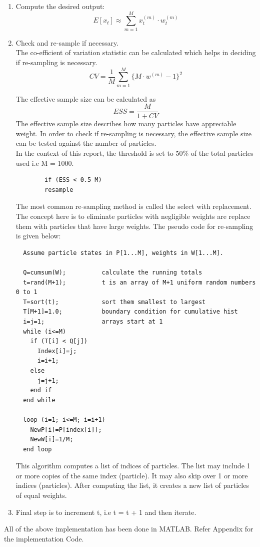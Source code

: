 \documentclass[12pt]{article}
\begin{document}
\begin{enumerate}
	\item Compute the desired output:
	\begin{equation}
		E[x_t] \approx \sum_{m=1}^M x_t^{(m)} \cdot w_t^{(m)}
		\label{eq:exp}
	\end{equation}
	
	\item Check and re-sample if necessary.\\
	 The co-efficient of variation statistic can be calculated which helps in deciding if re-sampling is necessary. \\
	\begin{equation}
		CV = \frac{1}{M} \sum_{m=1}^{M}\lbrace M \cdot w^{(m)} - 1 \rbrace ^ 2
		\label{eq:CV}
	\end{equation} 
	
	The effective sample size can be calculated as 
	\begin{equation}
		ESS = \frac{M}{1 + CV}
		\label{eq:ESS}
	\end{equation}
	The effective sample size describes how many particles have appreciable weight. In order to check if re-sampling is necessary, the effective sample size can be tested against the number of particles. \\
	In the context of this report, the threshold is set to 50\% of the total particles used i.e M = 1000.
	\begin{verbatim}
  		if (ESS < 0.5 M)
    	resample
	\end{verbatim}	
	
	The most common re-sampling method is called the select with replacement. The concept here is to eliminate particles with negligible weights are replace them with particles that have large weights. The pseudo code for re-sampling is given below:
\begin{verbatim}
  Assume particle states in P[1...M], weights in W[1...M].

  Q=cumsum(W);          calculate the running totals  
  t=rand(M+1);          t is an array of M+1 uniform random numbers 0 to 1
  T=sort(t);            sort them smallest to largest
  T[M+1]=1.0;           boundary condition for cumulative hist
  i=j=1;                arrays start at 1
  while (i<=M)
    if (T[i] < Q[j])
      Index[i]=j;
      i=i+1;
    else
      j=j+1;
    end if
  end while

  loop (i=1; i<=M; i=i+1)
    NewP[i]=P[index[i]];
    NewW[i]=1/M;
  end loop
\end{verbatim}
	This algorithm computes a list of indices of particles. The list may include 1 or more copies of the same index (particle). It may also skip over 1 or more indices (particles). After computing the list, it creates a new list of particles of equal weights. \\
	
	\item Final step is to increment t, i.e t = t + 1 and then iterate.
\end{enumerate}
All of the above implementation has been done in MATLAB. Refer Appendix for the implementation Code. 
\end{document}
